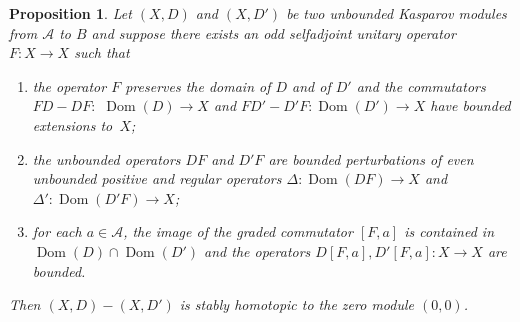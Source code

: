 \documentclass[pdftex]{sigma}
\numberwithin{equation}{section}
\newtheorem{prop}[Theorem]{Proposition}
 { \theoremstyle{definition}
\newtheorem{dfn}[Theorem]{Definition}
\newtheorem{exa}[Theorem]{Example}
\newtheorem{rem}[Theorem]{Remark} }
\newcommand{\De}{\Delta}
\newcommand{\s}[1]{\mathscr{#1}}
\begin{document}
\begin{prop}\label{p:phaequ}
Let $(X,D)$ and $(X,D')$ be two unbounded Kasparov modules from $\s A$ to $B$ and suppose there exists an odd selfadjoint unitary operator $F\colon X \to X$ such that
\begin{enumerate}\itemsep=0pt
\item[$1)$] the operator $F$ preserves the domain of $D$ and of $D'$ and the commutators $F D - D F\colon$ $\operatorname{Dom}(D) \to X$ and $F D' - D' F\colon \operatorname{Dom}(D') \to X$ have bounded extensions to~$X$;
\item[$2)$] the unbounded operators $D F$ and $D' F$ are bounded perturbations of even unbounded positive and regular operators $\De\colon \operatorname{Dom}(DF) \to X$ and $\De'\colon \operatorname{Dom}(D'F) \to X$;
\item[$3)$] for each $a \in \s A$, the image of the graded commutator $[F,a]$ is contained in $\operatorname{Dom}(D) \cap \operatorname{Dom}(D')$ and the operators $D [F,a], D' [F,a]\colon X \to X$ are bounded.
\end{enumerate}
Then $(X,D) - (X,D')$ is stably homotopic to the zero module $(0,0)$.
\end{prop}
\end{document}
